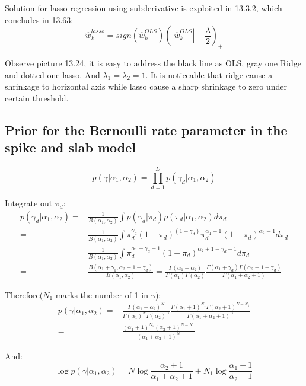 \documentclass[UTF8]{ctexart}
\begin{document}
Solution for lasso regression using subderivative is exploited in 13.3.2, which concludes in 13.63:
$$\hat{w}_{k}^{lasso}=sign(\hat{w}_{k}^{OLS})(|\hat{w}_{k}^{OLS}|-\frac{\lambda}{2})_{+}$$

Observe picture 13.24, it is easy to address the black line as OLS, gray one Ridge and dotted one lasso. And $\lambda_{1}=\lambda_{2}=1$. It is noticeable that ridge cause a shrinkage to horizontal axis while lasso cause a sharp shrinkage to zero under certain threshold.

\subsection{Prior for the Bernoulli rate parameter in the spike and slab model}
$$p(\gamma|\alpha_{1},\alpha_{2})=\prod_{d=1}^{D}p(\gamma_{d}|\alpha_{1},\alpha_{2})$$

Integrate out $\pi_{d}$:
\begin{align}
p(\gamma_{d}|\alpha_{1},\alpha_{2})=&\frac{1}{B(\alpha_{1},\alpha_{2})}\int p(\gamma_{d}|\pi_{d})p(\pi_{d}|\alpha_{1},\alpha_{2})d\pi_{d}\nonumber \\
=&\frac{1}{B(\alpha_{1},\alpha_{2})}\int \pi_{d}^{\gamma_{d}}(1-\pi_{d})^{(1-\gamma_{d})}\pi_{d}^{\alpha_{1}-1}(1-\pi_{d})^{\alpha_{2}-1}d\pi_{d}\nonumber \\
=&\frac{1}{B(\alpha_{1},\alpha_{2})}\int \pi_{d}^{\alpha_{1}+\gamma_{d}-1}(1-\pi_{d})^{\alpha_{2}+1-\gamma_{d} - 1}d\pi_{d}\nonumber \\
=&\frac{B(\alpha_{1}+\gamma_{d},\alpha_{2}+1-\gamma_{d})}{B(\alpha_{1},\alpha_{2})}=\frac{\Gamma(\alpha_{1}+\alpha_{2})}{\Gamma(\alpha_{1})\Gamma(\alpha_{2})} \frac{\Gamma(\alpha_{1}+\gamma_{d})\Gamma(\alpha_{2}+1-\gamma_{d})}{\Gamma(\alpha_{1}+\alpha_{2}+1)}\nonumber
\end{align}

Therefore($N_{1}$ marks the number of 1 in $\gamma$):
\begin{align}
p(\gamma|\alpha_{1},\alpha_{2})=&\frac{\Gamma(\alpha_{1}+\alpha_{2})^{N}}{\Gamma(\alpha_{1})^{N}\Gamma(\alpha_{2})^{N}}\frac{\Gamma(\alpha_{1}+1)^{N_{1}}\Gamma(\alpha_{2}+1)^{N-N_{1}}}{\Gamma(\alpha_{1}+\alpha_{2}+1)^{N}}\nonumber \\
=&\frac{(\alpha_{1}+1)^{N_{1}}(\alpha_{2}+1)^{N-N_{1}}}{(\alpha_{1}+\alpha_{2}+1)^{N}}\nonumber
\end{align}

And:
$$\log p(\gamma|\alpha_{1},\alpha_{2})=N\log\frac{\alpha_{2}+1}{\alpha_{1}+\alpha_{2}+1} + N_{1} \log \frac{\alpha_{1}+1}{\alpha_{2}+1}$$
\end{document}
